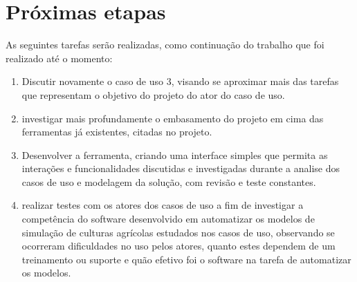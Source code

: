 \documentclass[12pt]{article}
\begin{document}
	
	
	\section{Próximas etapas}
	
	As seguintes tarefas serão realizadas, como continuação do trabalho que foi realizado até o momento:
	
	\begin{enumerate}
	
		\item Discutir novamente o caso de uso 3, visando se aproximar mais das tarefas que representam o objetivo do projeto do ator do caso de uso.
		
		\item investigar mais profundamente o embasamento do projeto em cima das ferramentas já existentes, citadas no projeto.
		
		\item Desenvolver a ferramenta, criando uma interface simples que permita as interações e funcionalidades discutidas e investigadas durante a analise dos casos de uso e modelagem da solução, com revisão e teste constantes.
		
		\item realizar testes com os atores dos casos de uso a fim de investigar a competência do software desenvolvido em automatizar os modelos de simulação de culturas agrícolas estudados nos casos de uso, observando se ocorreram dificuldades no uso pelos atores, quanto estes dependem de um treinamento ou suporte e quão efetivo foi o software na tarefa de automatizar os modelos.
		 
	\end{enumerate}
	
	
	 

	
\end{document}
